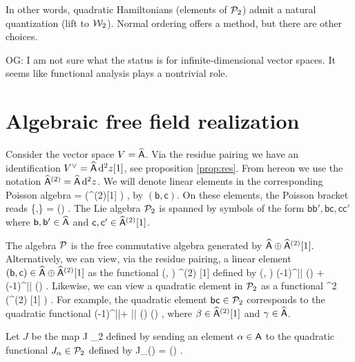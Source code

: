\documentclass[11pt]{amsart}
\def\C{{\mathbb{C}}}
\newcommand{\laurent}{\Hat \sfA}
\newcommand{\sfb}{\mathsf{b}}
\newcommand{\sfc}{\mathsf{c}}
\def\owen#1{{\textcolor{violet!65!black}{OG: {#1}}}}
\begin{document}
In other words, quadratic Hamiltonians (elements of $\mathcal P_2$) admit a natural quantization (lift to $\mathcal W_2$).
Normal ordering offers a method, but there are other choices.

\owen{I am not sure what the status is for infinite-dimensional vector spaces. It seems like functional analysis plays a nontrivial role.}

\section{Algebraic free field realization}

Consider the vector space $V = \laurent$.
Via the residue pairing we have an identification $V^\vee = \laurent \, \d^2 z [1]$, see proposition \ref{prop:res}.
From hereon we use the notation $\laurent^{(2)} = \laurent \, \d^2 z$.
We will denote linear elements in the corresponding Poisson algebra
\beqn
\cP = \Sym \left(\laurent  \oplus \laurent^{(2)}[1] \right) ,
\eeqn
by $(\sfb , \sfc)$.
On these elements, the Poisson bracket reads
\beqn
\{\sfb ,\sfc\} = \Res(\sfb \sfc) .
\eeqn
The Lie algebra $\mathcal P_2$ is spanned by symbols of the form $\sfb \sfb',\sfb \sfc, \sfc \sfc'$ where $\sfb,\sfb'\in \laurent$ and $\sfc,\sfc' \in \laurent^{(2)}[1]$.

The algebra $\mathcal P$ is the free commutative algebra generated by $\laurent \oplus \laurent^{(2)}[1]$.
Alternatively, we can view, via the residue pairing, a linear element $(\sfb, \sfc) \in \laurent \oplus \laurent^{(2)}[1]$ as the functional
\beqn
(\sfb, \sfc) \colon \laurent^{(2)} [1] \oplus \laurent \to \C
\eeqn
defined by
\beqn
(\beta, \gamma) \mapsto (-1)^{|\sfb|} \Res(\sfb \beta) + (-1)^{|\sfc|} \Res(\sfc \gamma) .
\eeqn
Likewise, we can view a quadratic element in $\mathcal P_2$ as a functional
\beqn
\Sym^2 \left(\laurent^{(2)} [1] \oplus \laurent \right) \to \C .
\eeqn
For example, the quadratic element $\sfb \sfc \in \cP_2$ corresponds to the quadratic functional
\beqn
\beta \gamma \mapsto (-1)^{|\sfb|+ |\sfc|} \Res (\sfb \beta) \Res(\sfc \gamma) ,
\eeqn
where $\beta \in \laurent^{(2)} [1]$ and $\gamma \in \laurent$.

Let $J$ be the map
\beqn
J \colon \laurent \to \cP_2
\eeqn
defined by sending an element $\alpha \in \mathsf A$ to the quadratic functional $J_\alpha \in \mathcal P_2$ defined by
\beqn
J_\alpha (\beta \gamma) = \Res(\beta \alpha \gamma) .
\eeqn
\end{document}
